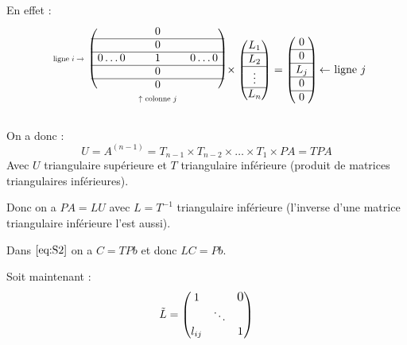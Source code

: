     En effet : 
\[
    \begin{blockarray}{cccc}
        \begin{block}{c(ccc)}
            & & 0 & \\
            \cline{2-4}
            & & 0 & \\
            \cline{2-4}
            \text{\scalebox{0.7}{ligne $i \rightarrow$}} & 0 \dots 0 & 1 & 0 \dots 0 \\
            \cline{2-4}
            & & 0 & \\
            \cline{2-4}
            & & 0 & \\
        \end{block}
        & & \text{\scalebox{0.7}{$\uparrow$ colonne $j$}} & & \\
    \end{blockarray}
    \times
    \begin{pmatrix}
        L_1 \\ \hline
        L_2 \\ \hline
        \vdots \\ \hline
        L_n
    \end{pmatrix}
    =
    \begin{pmatrix}
        0 \\ \hline
        0 \\ \hline
        L_j \\ \hline
        0 \\ \hline
        0
    \end{pmatrix} \text{$\leftarrow$ ligne $j$}
\]

On a donc :
\[
    U = A^{(n-1)} = T_{n-1} \times T_{n-2} \times \dots \times T_1 \times PA = TPA
\]
Avec $U$ triangulaire supérieure et $T$ triangulaire inférieure (produit de matrices triangulaires inférieures).

Donc on a $PA=LU$ avec $L=T^{-1}$ triangulaire inférieure (l'inverse d'une matrice triangulaire inférieure l'est aussi).

\begin{remark}
    Dans $\ref{eq:S2}$ on a $C=TPb$ et donc $LC=Pb$.
\end{remark}

Soit maintenant :\[
    \tilde{L} =
    \begin{pmatrix}
        1 & & \scalebox{1.2}{0} \\
        & \ddots & \\
        l_{ij} & & 1
    \end{pmatrix}
\]


